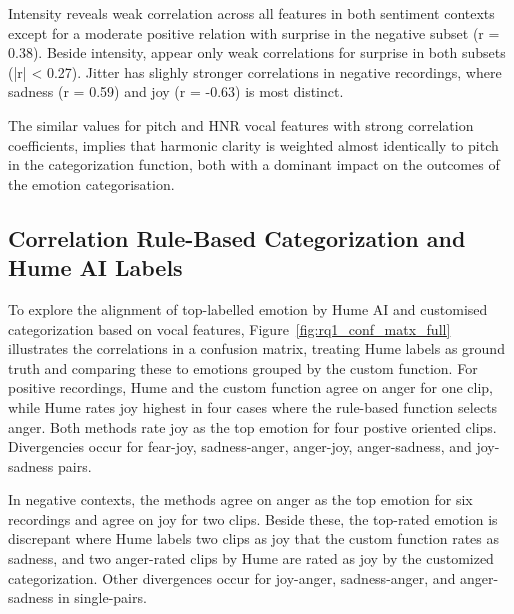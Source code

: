 Intensity reveals weak correlation across all features in both sentiment contexts except for a moderate positive relation with surprise in the negative subset (r = 0.38). Beside intensity, appear only weak correlations for surprise in both subsets (|r| < 0.27). 
Jitter has slighly stronger correlations in negative recordings, where sadness (r = 0.59) and joy (r = -0.63) is most distinct. 

The similar values for pitch and HNR vocal features with strong correlation coefficients, implies that harmonic clarity is weighted almost
identically to pitch in the categorization function, both with a dominant impact on the outcomes of the emotion categorisation. 

\subsection{Correlation Rule-Based Categorization and Hume AI Labels}

To explore the alignment of top-labelled emotion by Hume AI and customised categorization based on vocal features, Figure~\ref{fig:rq1_conf_matx_full} illustrates the correlations in a confusion matrix, treating Hume labels as ground truth and comparing these to emotions grouped by the custom function.  
For positive recordings, Hume and the custom function agree on anger for one clip, while Hume rates joy highest in four cases where the rule-based function selects anger. 
Both methods rate joy as the top emotion for four postive oriented clips. Divergencies occur for fear-joy, sadness-anger, anger-joy, anger-sadness, and joy-sadness pairs. 
 
In negative contexts, the methods agree on anger as the top emotion for six recordings and agree on joy for two clips. 
Beside these, the top-rated emotion is discrepant where Hume labels two clips as joy that the custom function rates as sadness, and two anger-rated clips by Hume are rated as 
joy by the customized categorization. Other divergences occur for joy-anger, sadness-anger, and anger-sadness in single-pairs. 

